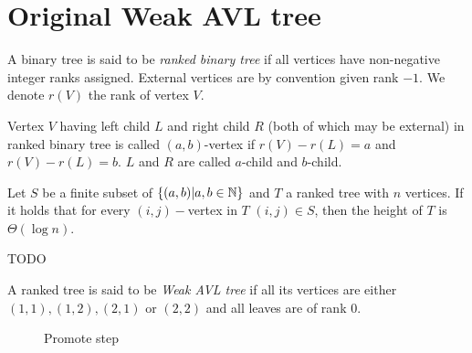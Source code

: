 

\section{Original Weak AVL tree}

\begin{defn}
A binary tree is said to be {\em ranked binary tree} if all vertices have non-negative integer ranks assigned. External vertices are by convention given rank $-1$. We denote $r(V)$ the rank of vertex $V$.
\end{defn}

\begin{defn}
Vertex $V$ having left child $L$ and right child $R$ (both of which may be external) in ranked binary tree is called $(a,b)$-vertex if $r(V) - r(L) = a$ and $r(V) - r(L) = b$. $L$ and $R$ are called $a$-child and $b$-child.
\end{defn}

\begin{thm}
Let $S$ be a finite subset of $\{ (a,b) | a,b \in \mathbb{N} \}$ and $T$ a ranked tree with $n$ vertices. If it holds that for every $(i,j)-$vertex in $T$ $(i,j) \in S$, then the height of $T$ is $\Theta(\log n)$.
\end{thm}

\begin{myproof}
TODO
\end{myproof}

\begin{defn}
A ranked tree is said to be {\em Weak AVL tree} if all its vertices are either $(1,1), (1,2), (2,1)$ or $(2,2)$ and all leaves are of rank 0.
\end{defn}

\begin{figure}
\begin{center}
\qquad
{}
\end{center}
\caption{Promote step}
\end{figure}

